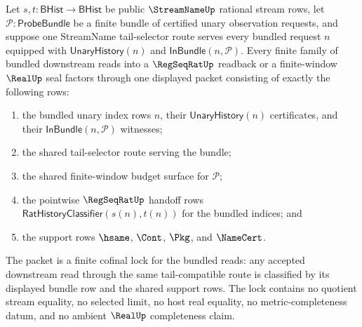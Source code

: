 \begin{theorem}
\label{thm:streamname-tail-compatible-window-cofinal-bundle-lock}
Let $s,t:\mathsf{BHist}\to\mathsf{BHist}$ be public $\StreamNameUp$ rational
stream rows, let $\mathcal P:\mathsf{ProbeBundle}$ be a finite bundle of
certified unary observation requests, and suppose one StreamName tail-selector
route serves every bundled request $n$ equipped with
$\mathsf{UnaryHistory}(n)$ and $\mathsf{InBundle}(n,\mathcal P)$. Every finite
family of bundled downstream reads into a $\RegSeqRatUp$ readback or a
finite-window $\RealUp$ seal factors through one displayed packet consisting
of exactly the following rows:
\begin{enumerate}
\item the bundled unary index rows $n$, their $\mathsf{UnaryHistory}(n)$
certificates, and their $\mathsf{InBundle}(n,\mathcal P)$ witnesses;
\item the shared tail-selector route serving the bundle;
\item the shared finite-window budget surface for $\mathcal P$;
\item the pointwise $\RegSeqRatUp$ handoff rows
$\mathsf{RatHistoryClassifier}(s(n),t(n))$ for the bundled indices; and
\item the support rows $\hsame$, $\Cont$, $\Pkg$, and $\NameCert$.
\end{enumerate}
The packet is a finite cofinal lock for the bundled reads: any accepted
downstream read through the same tail-compatible route is classified by its
displayed bundle row and the shared support rows. The lock contains no
quotient stream equality, no selected limit, no host real equality, no
metric-completeness datum, and no ambient $\RealUp$ completeness claim.
\end{theorem}
